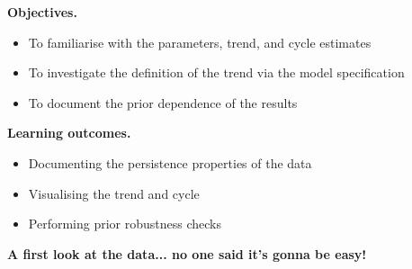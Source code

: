 \documentclass[notes,blackandwhite,mathsans,usenames,dvipsnames]{beamer}
\begin{document}
{
\begin{frame}

\bigskip\textbf{\color{mcxs1}Objectives.}
\begin{itemize}[label=$\blacktriangleright$]
\item {\color{mcxs1}To familiarise with the parameters, trend, and cycle estimates}
\item {\color{mcxs1}To investigate the definition of the trend via the model specification}
\item {\color{mcxs1}To document the prior dependence of the results}
\end{itemize}

\bigskip\textbf{\color{mcxs2}Learning outcomes.}
\begin{itemize}[label=$\blacktriangleright$]
\item {\color{mcxs2}Documenting the persistence properties of the data}
\item {\color{mcxs2}Visualising the trend and cycle}
\item {\color{mcxs2}Performing prior robustness checks}
\end{itemize}

\end{frame}
}




{
\begin{frame}

\begin{adjustwidth}{-0.5cm}{0cm}
\vspace{8.3cm}
\textbf{{\color{mcxs2}A first look at the data...} {\color{mcxs3}no one said it's gonna be easy!}}
\end{adjustwidth}

\end{frame}
}
\end{document}
